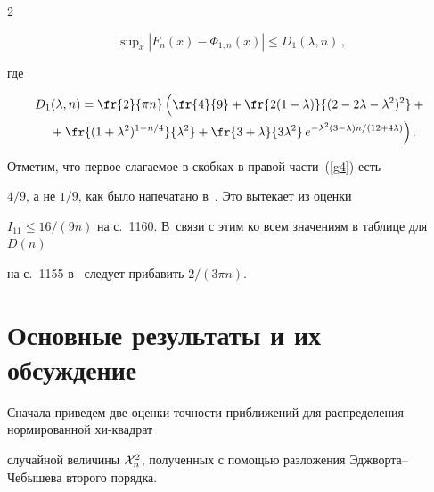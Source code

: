 \begin{multicols}{2}
{$$\sup\nolimits_x |F_n(x) - \Phi_{1,n}(x)| \leq D_1(\lambda, n)\,, $$


где}


\columnbreak





\noindent


\begin{multline}


D_1(\lambda, n) = \fr{2}{\pi n}\left(


\vphantom{\fr{(1+\lambda^2)^{1-n/4}}{\lambda^2}}


\fr{4}{9} +


\fr{2(1-\lambda)}{(2-2\lambda - \lambda^2)^2} +{}\right.\\


\!\left.{}+\fr{(1+\lambda^2)^{1-n/4}}{\lambda^2} +


\fr{3+\lambda}{3\lambda^2}\,e^{-\lambda^2(3-\lambda)n/(12+4\lambda)}


\right).\!\!


\label{g4}


\end{multline}





\smallskip





Отметим, что первое слагаемое в скобках в правой части~(\ref{g4}) есть 


$4/9$, а не $1/9$, как было напечатано в~\cite{1-cr}. Это  вытекает из оценки 


$ I_{11} \leq 16/(9n)$ на с.~1160. В~связи с этим ко всем значениям в таблице для~ $D(n)$ 


на с.~1155 в~\cite{1-cr} следует прибавить  $2/(3\pi n)$.





\section{Основные результаты и их обсуждение}





Сначала приведем две оценки точности приближений для распределения нормированной хи-квад\-рат 


случайной величины ${\cal X}_n^2$, полученных с помощью разложения Эджворта--Чебышева второго порядка.






\end{multicols}
